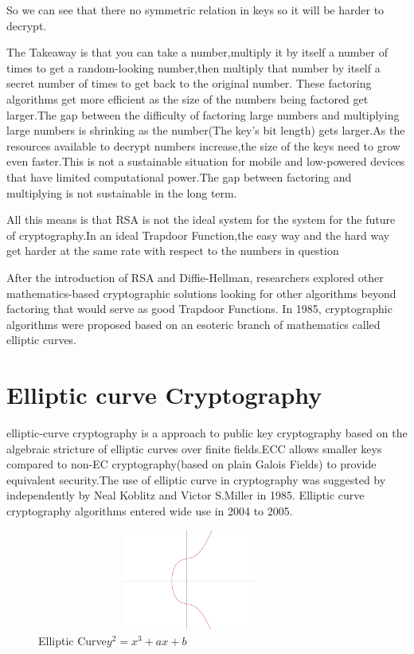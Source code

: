 \documentclass{article}
\begin{document}
So we can see that there no symmetric relation in keys so it will be harder to decrypt.

The Takeaway is that you can take a number,multiply it by itself a number of times to get a random-looking number,then multiply that number by itself a secret number of times to get back to the original number.
These factoring algorithms get more efficient as the size of the numbers being factored get larger.The gap between the difficulty of factoring large numbers and multiplying large numbers is shrinking as the number(The key's bit length) gets larger.As the resources available to decrypt numbers increase,the size of the keys need to grow even faster.This is not a sustainable situation for mobile and low-powered devices that have limited computational power.The gap between factoring and multiplying is not sustainable in the long term.

All this means is that RSA is not the ideal system for the system for the future of cryptography.In an ideal Trapdoor  Function,the easy way and the hard way get harder at the same rate with respect to the numbers in question

After the introduction of RSA and Diffie-Hellman, researchers explored other mathematics-based cryptographic solutions looking for other algorithms beyond factoring that would serve as good Trapdoor Functions. In 1985, cryptographic algorithms were proposed based on an esoteric branch of mathematics called elliptic curves.
\section{Elliptic curve Cryptography}
elliptic-curve cryptography is a approach to public key cryptography based on the algebraic stricture of elliptic curves over finite fields.ECC allows smaller keys compared to non-EC cryptography(based on plain Galois Fields) to provide equivalent security.The use of elliptic curve in cryptography was suggested by independently by Neal Koblitz and Victor S.Miller in 1985. Elliptic curve cryptography algorithms entered wide use in 2004 to 2005.

\begin{figure}[h]
\includegraphics[width=10cm, height=3.3cm]{ECC.png}
 \caption{Elliptic Curve\:\(y^2=x^3+ax+b\)}
\centering
\end{figure}
\end{document}
